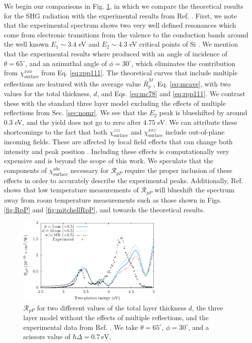 We begin our comparisons in Fig. \ref{fig:average}, in which we compare the
theoretical results for the SHG radiation with the experimental results from
Ref. \cite{mejiaPRB02}. First, we note that the experimental spectrum shows two
very well defined resonances which come from electronic transitions from the
valence to the conduction bands around the well known $E_{1}\sim 3.4$ eV and
$E_{2}\sim 4.3$ eV critical points of Si \cite{yubook}. We mention that the
experimental results where produced with an angle of incidence of
$\theta=65^\circ$, and an azimuthal angle of $\phi=30^\circ$, which eliminates
the contribution from $\chi^{xxx}_{\mathrm{surface}}$ from Eq.
\eqref{eq:rpp111}. The theoretical curves that include multiple reflections are
featured with the average value $\bar{R}^{M}_{p}$, Eq.
\eqref{eq:mcave}, with two values for the total thickness, $d$, and Eqs.
\eqref{eq:mc78} and \eqref{eq:rpp111}. We contrast these with the standard three
layer model excluding the effects of multiple reflections from Sec.
\ref{sec:nomr}. We see that the $E_{2}$ peak is blueshifted by around 0.3 eV,
and the yield does not go to zero after 4.75 eV. We can attribute these
shortcomings to the fact that both $\chi^{zzz}_{\mathrm{surface}}$ and
$\chi^{xxz}_{\mathrm{surface}}$ include out-of-plane incoming fields. These are
affected by local field effects that can change both intensity and peak position
\cite{tancognedejean:tel-01235611}. Including these effects is computationally
very expensive and is beyond the scope of this work. We speculate that the
components of $\chi^{abc}_{\mathrm{surface}}$ necessary for $\mathcal{R}_{pP}$
require the proper inclusion of these effects in order to accurately describe
the experimental peaks. Additionally, Ref. \cite{dadapPRB97} shows that low
temperature measurements of $\mathcal{R}_{pP}$ will blueshift the spectrum away
from room temperature measurements such as those shown in Figs. \ref{fig:RpP}
and \ref{fig:mitchellRpP}, and towards the theoretical results.

\begin{figure}[t]
\centering
\includegraphics[width=0.64\textwidth]{content/figures/fig-Si1x1-MRthickness}
\caption[$\mathcal{R}_{pP}$ for two thickness values $d$ of the thin layer
$\ell$.] {$\mathcal{R}_{pP}$ for two different values of the total layer
thickness $d$, the three layer model without the effects of multiple
reflections, and the experimental data from Ref. \cite{mejiaPRB02}. We take
$\theta=65^{\circ}$, $\phi=30^{\circ}$, and a scissors value of $\hbar\Delta =
0.7\,\text{eV}$.}
\label{fig:average}
\end{figure}

